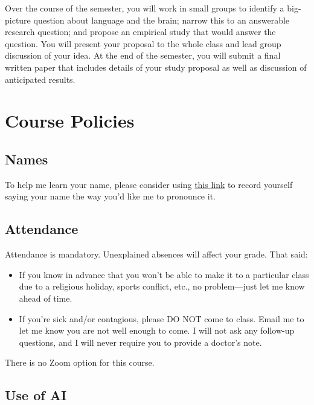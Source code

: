 \documentclass[
  letterpaper,
  DIV=11,
  numbers=noendperiod]{scrartcl}
\providecommand{\tightlist}{%
  \setlength{\itemsep}{0pt}\setlength{\parskip}{0pt}}
\begin{document}
Over the course of the semester, you will work in small groups to
identify a big-picture question about language and the brain; narrow
this to an answerable research question; and propose an empirical study
that would answer the question. You will present your proposal to the
whole class and lead group discussion of your idea. At the end of the
semester, you will submit a final written paper that includes details of
your study proposal as well as discussion of anticipated results.

\section{\texorpdfstring{\textbf{Course
Policies}}{Course Policies}}\label{course-policies}

\subsection{\texorpdfstring{\textbf{Names}}{Names}}\label{names}

To help me learn your name, please consider using
\href{https://www.speakpipe.com/HeidiGetz}{this link} to record yourself
saying your name the way you'd like me to pronounce it.

\subsection{\texorpdfstring{\textbf{Attendance}}{Attendance}}\label{attendance}

Attendance is mandatory. Unexplained absences will affect your grade.
That said:

\begin{itemize}
\tightlist
\item
  If you know in advance that you won't be able to make it to a
  particular class due to a religious holiday, sports conflict, etc., no
  problem---just let me know ahead of time.\\
\item
  If you're sick and/or contagious, please DO NOT come to class. Email
  me to let me know you are not well enough to come. I will not ask any
  follow-up questions, and I will never require you to provide a
  doctor's note.
\end{itemize}

There is no Zoom option for this course.

\subsection{\texorpdfstring{\textbf{Use of
AI}}{Use of AI}}\label{use-of-ai}
\end{document}
